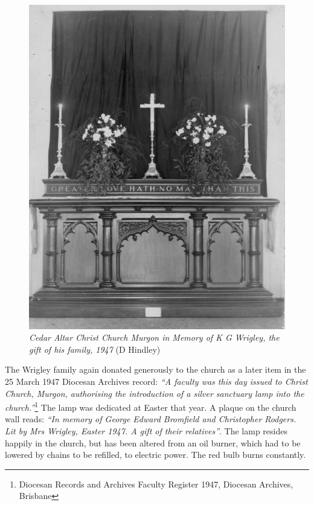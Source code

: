 \begin{figure}
\begin{center}
\includegraphics[width=1.\linewidth,center]{../images/cedarAltar1947.jpg}
\caption{{\itshape Cedar Altar Christ Church Murgon in Memory of K G Wrigley, the gift of his family, 1947} {\scriptsize(D Hindley)}}
\end{center}
\end{figure}




The Wrigley family again donated generously to the church as a later item in the 25 March 1947 Diocesan Archives record: \emph{``A faculty was this day issued to Christ Church, Murgon, authorising the introduction of a silver sanctuary lamp into the church.''}\footnote{Diocesan Records and Archives Faculty Register 1947, Diocesan Archives, Brisbane} The lamp was dedicated at Easter that year. A plaque on the church wall reads: \emph{``In memory of George Edward Bromfield and Christopher Rodgers. Lit by Mrs Wrigley, Easter 1947. A gift of their relatives''}. The lamp resides happily in the church, but has been altered from an oil burner, which had to be lowered by chains to be refilled, to electric power. The red bulb burns constantly.


